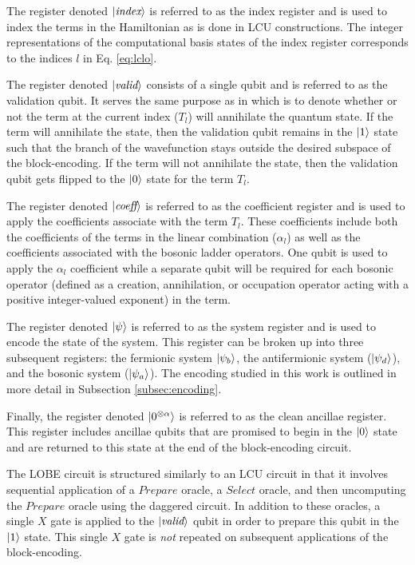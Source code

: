The register denoted $\ket{\textit{index}}$ is referred to as the index register and is used to index the terms in the Hamiltonian as is done in LCU constructions. 
The integer representations of the computational basis states of the index register corresponds to the indices $l$ in Eq. \ref{eq:lclo}. 

The register denoted $\ket{\textit{valid}}$ consists of a single qubit and is referred to as the validation qubit.
It serves the same purpose as in \cite{liu2024efficient} which is to denote whether or not the term at the current index ($T_l$) will annihilate the quantum state.
If the term will annihilate the state, then the validation qubit remains in the $\ket{1}$ state such that the branch of the wavefunction stays outside the desired subspace of the block-encoding.
If the term will not annihilate the state, then the validation qubit gets flipped to the $\ket{0}$ state for the term $T_l$.

The register denoted $\ket{\textit{coeff}}$ is referred to as the coefficient register and is used to apply the coefficients associate with the term $T_l$. 
These coefficients include both the coefficients of the terms in the linear combination ($\alpha_l$) as well as the coefficients associated with the bosonic ladder operators.
One qubit is used to apply the $\alpha_l$ coefficient while a separate qubit will be required for each bosonic operator (defined as a creation, annihilation, or occupation operator acting with a positive integer-valued exponent) in the term.

The register denoted $\ket{\psi}$ is referred to as the system register and is used to encode the state of the system.
This register can be broken up into three subsequent registers: the fermionic system $\ket{\psi_b}$, the antifermionic system ($\ket{\psi_d}$), and the bosonic system ($\ket{\psi_a}$).
The encoding studied in this work is outlined in more detail in Subsection \ref{subsec:encoding}.

Finally, the register denoted $\ket{0^{\otimes \alpha}}$ is referred to as the clean ancillae register.
This register includes ancillae qubits that are promised to begin in the $\ket{0}$ state and are returned to this state at the end of the block-encoding circuit.

The LOBE circuit is structured similarly to an LCU circuit in that it involves sequential application of a $\textit{Prepare}$ oracle, a $\textit{Select}$ oracle, and then uncomputing the $\textit{Prepare}$ oracle using the daggered circuit.
In addition to these oracles, a single $X$ gate is applied to the $\ket{\textit{valid}}$ qubit in order to prepare this qubit in the $\ket{1}$ state.
This single $X$ gate is \textit{not} repeated on subsequent applications of the block-encoding.

